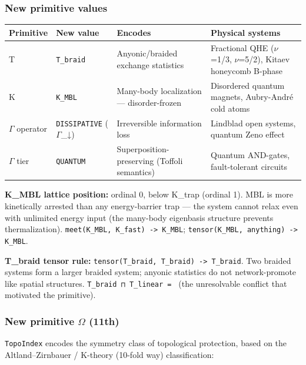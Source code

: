 \documentclass[12pt,a4paper]{article}
\begin{document}
\subsubsection{New primitive values}

\begin{table}[htbp]
\centering
\small
{}
\begin{tabularx}{\textwidth}{>{\centering\arraybackslash}X >{\centering\arraybackslash}X >{\centering\arraybackslash}X >{\centering\arraybackslash}X}
\toprule
\rowcolor{gray!25}\textbf{Primitive} & \textbf{New value} & \textbf{Encodes} & \textbf{Physical systems} \\
\midrule
\rowcolors{1}{white}{gray!10}
T & \texttt{T\_braid} & Anyonic/braided exchange statistics & Fractional QHE ($\nu$=1/3, $\nu$=5/2), Kitaev honeycomb B-phase \\
K & \texttt{K\_MBL} & Many-body localization --- disorder-frozen & Disordered quantum magnets, Aubry-André cold atoms \\
$\Gamma$ operator & \texttt{DISSIPATIVE} ($\Gamma$\_↓) & Irreversible information loss & Lindblad open systems, quantum Zeno effect \\
$\Gamma$ tier & \texttt{QUANTUM} & Superposition-preserving (Toffoli semantics) & Quantum AND-gates, fault-tolerant circuits \\
\bottomrule
\end{tabularx}
\end{table}

\textbf{K\_MBL lattice position:} ordinal 0, below K\_trap (ordinal 1). MBL is more kinetically arrested than any energy-barrier trap --- the system cannot relax even with unlimited energy input (the many-body eigenbasis structure prevents thermalization). \texttt{meet(K\_MBL, K\_fast) -\textgreater{} K\_MBL}; \texttt{tensor(K\_MBL, anything) -\textgreater{} K\_MBL}.

\textbf{T\_braid tensor rule:} \texttt{tensor(T\_braid, T\_braid) -\textgreater{} T\_braid}. Two braided systems form a larger braided system; anyonic statistics do not network-promote like spatial structures. \texttt{T\_braid ⊓ T\_linear = \perp} (the unresolvable conflict that motivated the primitive).

\subsubsection{New primitive $\Omega$ (11th)}

\texttt{TopoIndex} encodes the symmetry class of topological protection, based on the Altland--Zirnbauer / K-theory (10-fold way) classification:
\end{document}
